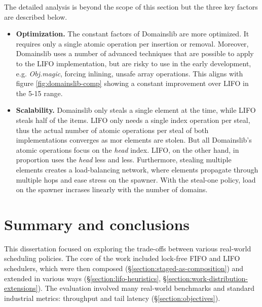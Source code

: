 \documentclass[12pt,a4paper,twoside]{report}
\begin{document}
The detailed analysis is beyond the scope of this section but the three key factors are described below.
\begin{itemize}
    \item \textbf{Optimization.} The constant factors of Domainslib are more optimized. It requires only a single atomic operation per insertion or removal. Moreover, Domainslib uses a number of advanced techniques that are possible to apply to the LIFO implementation, but are risky to use in the early development, e.g. \textit{Obj.magic}, forcing inlining, unsafe array operations. This aligns with figure \ref{fig:domainslib-comp} showing a constant improvement over LIFO in the 5-15 range. 
    \item \textbf{Scalability.} Domainslib only steals a single element at the time, while LIFO steals half of the items. LIFO only needs a single index operation per steal, thus the actual number of atomic operations per steal of both implementations converges as mor elements are stolen. But all Domainslib's atomic operations focus on the \textit{head} index. LIFO, on the other hand, in proportion uses the \textit{head} less and less. Furthermore, stealing multiple elements creates a load-balancing network, where elements propagate through multiple hops and ease stress on the spawner. With the steal-one policy, load on the spawner incrases linearly with the number of domains.
\end{itemize} 

\chapter{Summary and conclusions}
\label{section:summary_and_conclusion}

This dissertation focused on exploring the trade-offs between various real-world scheduling policies. The core of the work included lock-free FIFO and LIFO schedulers, which were then composed (\S\ref{section:staged-as-composition}) and extended in various ways (\S\ref{section:lifo-heuristics}, \S\ref{section:work-distribution-extensions}). The evaluation involved many real-world benchmarks and standard industrial metrics: throughput and tail latency (\S\ref{section:objectives}). 
\end{document}
